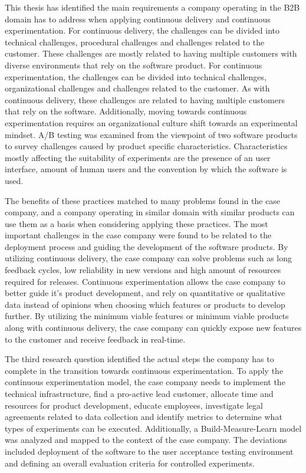 \documentclass[english]{tktltiki2}
\theoremstyle{definition}
\theoremstyle{remark}
\begin{document}
This thesis has identified the main requirements a company operating in the B2B domain has to address when applying continuous delivery and continuous experimentation. For continuous delivery, the challenges can be divided into technical challenges, procedural challenges and challenges related to the customer. These challenges are mostly related to having multiple customers with diverse environments that rely on the software product. For continuous experimentation, the challenges can be divided into technical challenges, organizational challenges and challenges related to the customer. As with continuous delivery, these challenges are related to having multiple customers that rely on the software. Additionally, moving towards continuous experimentation requires an organizational culture shift towards an experimental mindset. A/B testing was examined from the viewpoint of two software products to survey challenges caused by product specific characteristics. Characteristics mostly affecting the suitability of experiments are the presence of an user interface, amount of human users and the convention by which the software is used.

The benefits of these practices matched to many problems found in the case company, and a company operating in similar domain with similar products can use them as a basis when considering applying these practices. The most important challenges in the case company were found to be related to the deployment process and guiding the development of the software products. By utilizing continuous delivery, the case company can solve problems such as long feedback cycles, low reliability in new versions and high amount of resources required for releases. Continuous experimentation allows the case company to better guide it's product development, and rely on quantitative or qualitative data instead of opinions when choosing which features or products to develop further. By utilizing the minimum viable features or minimum viable products along with continuous delivery, the case company can quickly expose new features to the customer and receive feedback in real-time.

The third research question identified the actual steps the company has to complete in the transition towards continuous experimentation. To apply the continuous experimentation model, the case company needs to implement the technical infrastructure, find a pro-active lead customer, allocate time and resources for product development, educate employees, investigate legal agreements related to data collection and identify metrics to determine what types of experiments can be executed. Additionally, a Build-Measure-Learn model \cite{fagerholm2014building} was analyzed and mapped to the context of the case company. The deviations included deployment of the software to the user acceptance testing environment and defining an overall evaluation criteria for controlled experiments. 
\end{document}
